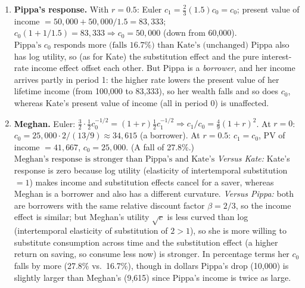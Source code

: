 \documentclass[11pt]{article}
\newcommand{\ans}[1]{$\boxed{#1}$}
\begin{document}
\begin{enumerate}[label=\textbf{\arabic*.}, leftmargin=*]
\item \textbf{Pippa's response.} With $r=0.5$: Euler $c_1 = \tfrac23(1.5)c_0 = c_0$; present value of income $=50{,}000+50{,}000/1.5 = 83{,}333$; $c_0(1+1/1.5) = 83{,}333 \Rightarrow c_0 = 50{,}000$ (down from 60,000).
\ans{\text{Pippa's } c_0 \text{ responds more (falls 16.7\%) than Kate's (unchanged)}}
Pippa also has log utility, so (as for Kate) the substitution effect and the pure interest-rate income effect offset each other. But Pippa is a \emph{borrower}, and her income arrives partly in period 1: the higher rate lowers the present value of her lifetime income (from 100,000 to 83,333), so her wealth falls and so does $c_0$, whereas Kate's present value of income (all in period 0) is unaffected.

\item \textbf{Meghan.} Euler: $\tfrac32\cdot\tfrac12 c_0^{-1/2} = (1+r)\tfrac12 c_1^{-1/2} \Rightarrow c_1/c_0 = \tfrac49(1+r)^2$. At $r=0$: $c_0 = 25{,}000\cdot 2/(13/9) \approx 34{,}615$ (a borrower). At $r=0.5$: $c_1=c_0$, PV of income $=41{,}667$, $c_0 = 25{,}000$. (A fall of 27.8\%.)
\ans{\text{Meghan's response is stronger than Pippa's and Kate's}}
\emph{Versus Kate:} Kate's response is zero because log utility (elasticity of intertemporal substitution $=1$) makes income and substitution effects cancel for a saver, whereas Meghan is a borrower and also has a different curvature. \emph{Versus Pippa:} both are borrowers with the same relative discount factor $\beta=2/3$, so the income effect is similar; but Meghan's utility $\sqrt c$ is less curved than log (intertemporal elasticity of substitution of $2>1$), so she is more willing to substitute consumption across time and the substitution effect (a higher return on saving, so consume less now) is stronger. In percentage terms her $c_0$ falls by more (27.8\% vs.\ 16.7\%), though in dollars Pippa's drop (10,000) is slightly larger than Meghan's (9,615) since Pippa's income is twice as large.

\end{enumerate}
\end{document}
